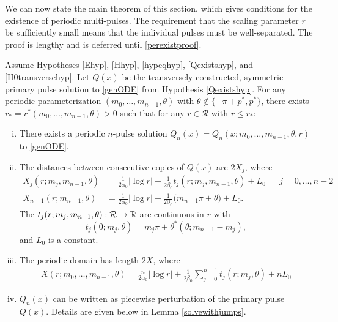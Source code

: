 \documentclass[thesis.tex]{subfiles}
\begin{document}
We can now state the main theorem of this section, which gives conditions for the existence of periodic multi-pulses. The requirement that the scaling parameter $r$ be sufficiently small means that the individual pulses must be well-separated. The proof is lengthy and is deferred until \cref{perexistproof}.

\begin{theorem}\label{perexist}
Assume Hypotheses \ref{Ehyp}, \ref{Hhyp}, \ref{hypeqhyp}, \ref{Qexistshyp}, and \ref{H0transversehyp}. Let $Q(x)$ be the transversely constructed, symmetric primary pulse solution to \eqref{genODE} from Hypothesis \ref{Qexistshyp}. For any periodic parameterization $(m_0, \dots, m_{n-1}, \theta)$ with $\theta \notin \{-\pi + p^*, p^* \}$, there exists $r_* = r^*(m_0, \dots, m_{n-1}, \theta) > 0$ such that for any $r \in \mathcal{R}$ with $r \leq r_*$:
\begin{enumerate}[(i)]
	\item There exists a periodic $n$-pulse solution $Q_n(x) = Q_n(x; m_0, \dots, m_{n-1}, \theta, r)$ to \eqref{genODE}.

	\item The distances between consecutive copies of $Q(x)$ are $2X_j$, where
	\begin{align}\label{Xj}
		X_j(r; m_j, m_{n-1},\theta) &= \frac{1}{2 \alpha_0} |\log r| + \frac{1}{2\beta_0} t_j(r; m_j,m_{n-1}, \theta) + L_0 && j = 0, \dots, n-2 \\
		X_{n-1}(r; m_{n-1}, \theta) &= \frac{1}{2 \alpha_0} |\log r| + \frac{1}{2 \beta_0}\big( m_{n-1}\pi + \theta \big) + L_0.
	\end{align}
	The $t_j(r; m_j, m_{n-1}, \theta): \mathcal{R} \rightarrow \mathbb{R}$ are continuous in $r$ with 
	\[
	t_j(0; m_j, \theta) = m_j \pi + \theta^*(\theta; m_{n-1} - m_j),
	\]
	and $L_0$ is a constant.

	\item The periodic domain has length $2X$, where
	\begin{align}\label{Xdomain}
	X(r; m_0, \dots, m_{n-1}, \theta) = \frac{n}{2\alpha_0} |\log r| + \frac{1}{2\beta_0} \sum_{j=0}^{n-1} t_j(r; m_j, \theta) + n L_0
	\end{align}

	\item $Q_n(x)$ can be written as piecewise perturbation of the primary pulse $Q(x)$. Details are given below in Lemma \ref{solvewithjumps}.
\end{enumerate}
\end{theorem}
\end{document}
